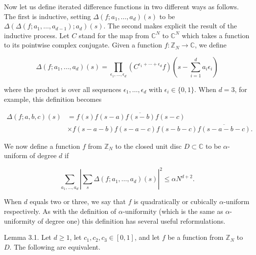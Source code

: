 \documentclass[10pt]{article}
\begin{document}
Now let us define iterated difference functions in two different ways as follows. The first is inductive, setting $\Delta\left(f ; a_{1}, \ldots, a_{d}\right)(s)$ to be $\Delta\left(\Delta\left(f ; a_{1}, \ldots, a_{d-1}\right) ; a_{d}\right)(s)$. The second makes explicit the result of the inductive process. Let $C$ stand for the map from $\mathbb{C}^{N}$ to $\mathbb{C}^{N}$ which takes a function to its pointwise complex conjugate. Given a function $f: \mathbb{Z}_{N} \rightarrow \mathbb{C}$, we define

$$
\Delta\left(f ; a_{1}, \ldots, a_{d}\right)(s)=\prod_{\epsilon_{1}, \ldots, \epsilon_{d}}\left(C^{\epsilon_{1}+\cdots+\epsilon_{d}} f\right)\left(s-\sum_{i=1}^{d} a_{i} \epsilon_{i}\right)
$$

where the product is over all sequences $\epsilon_{1}, \ldots, \epsilon_{d}$ with $\epsilon_{i} \in\{0,1\}$. When $d=3$, for example, this definition becomes

$$
\begin{aligned}
\Delta(f ; a, b, c)(s) & =f(s) \overline{f(s-a) f(s-b) f(s-c)} \\
& \times f(s-a-b) f(s-a-c) f(s-b-c) \overline{f(s-a-b-c)} .
\end{aligned}
$$

We now define a function $f$ from $\mathbb{Z}_{N}$ to the closed unit disc $D \subset \mathbb{C}$ to be $\alpha$-uniform of degree $d$ if

$$
\sum_{a_{1}, \ldots, a_{d}}\left|\sum_{s} \Delta\left(f ; a_{1}, \ldots, a_{d}\right)(s)\right|^{2} \leqslant \alpha N^{d+2} .
$$

When $d$ equals two or three, we say that $f$ is quadratically or cubically $\alpha$-uniform respectively. As with the definition of $\alpha$-uniformity (which is the same as $\alpha$-uniformity of degree one) this definition has several useful reformulations.

Lemma 3.1. Let $d \geqslant 1$, let $c_{1},c_{2},c_{3}\in[0,1]$, and let $f$ be a function from $\mathbb{Z}_{N}$ to $D$. The following are equivalent.
\end{document}
